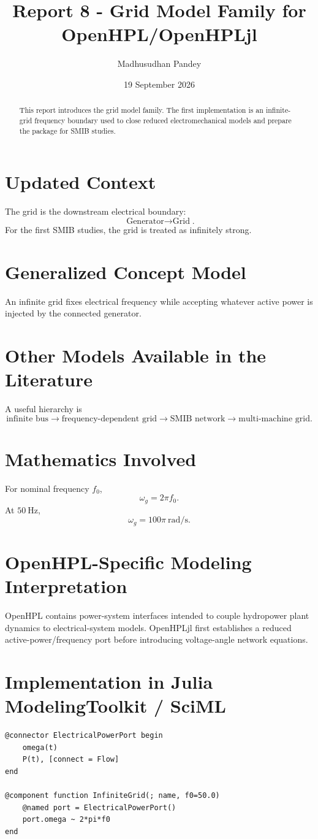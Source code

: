 \documentclass[11pt,a4paper]{article}
\title{Report 8 - Grid Model Family for OpenHPL/OpenHPLjl}
\author{Madhusudhan Pandey}
\date{19 September 2026}
\begin{document}
\maketitle
\begin{abstract}
This report introduces the grid model family. The first implementation is an infinite-grid frequency boundary used to close reduced electromechanical models and prepare the package for SMIB studies.
\end{abstract}
\section{Updated Context}
The grid is the downstream electrical boundary:
\[
\boxed{\text{Generator}\rightarrow\text{Grid}}.
\]
For the first SMIB studies, the grid is treated as infinitely strong.

\section{Generalized Concept Model}
An infinite grid fixes electrical frequency while accepting whatever active power is injected by the connected generator.

\section{Other Models Available in the Literature}
A useful hierarchy is
\[
\boxed{\text{infinite bus}\rightarrow\text{frequency-dependent grid}\rightarrow\text{SMIB network}\rightarrow\text{multi-machine grid}}.
\]

\section{Mathematics Involved}
For nominal frequency $f_0$,
\[
\boxed{\omega_g=2\pi f_0}.
\]
At $50~\si{\hertz}$,
\[
\omega_g=100\pi~\si{\radian\per\second}.
\]

\section{OpenHPL-Specific Modeling Interpretation}
OpenHPL contains power-system interfaces intended to couple hydropower plant dynamics to electrical-system models. OpenHPLjl first establishes a reduced active-power/frequency port before introducing voltage-angle network equations.

\section{Implementation in Julia ModelingToolkit / SciML}
\begin{lstlisting}
@connector ElectricalPowerPort begin
    omega(t)
    P(t), [connect = Flow]
end

@component function InfiniteGrid(; name, f0=50.0)
    @named port = ElectricalPowerPort()
    port.omega ~ 2*pi*f0
end
\end{lstlisting}
\end{document}
